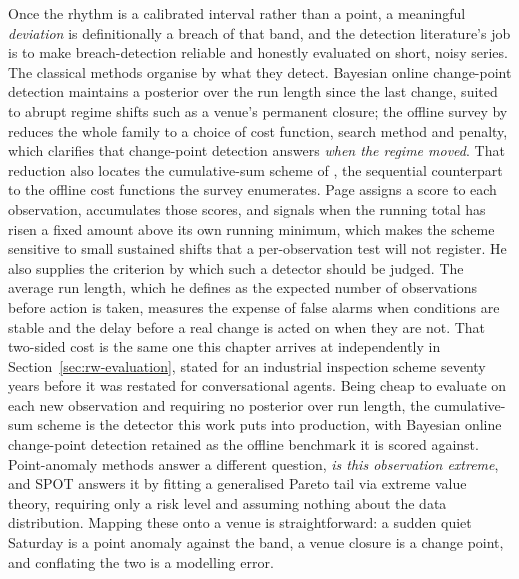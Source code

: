 Once the rhythm is a calibrated interval rather than a point, a meaningful
\emph{deviation} is definitionally a breach of that band, and the detection
literature's job is to make breach-detection reliable and honestly evaluated
on short, noisy series. The classical methods organise by what they detect.
Bayesian online change-point detection \citep{adams_bayesian_2007} maintains a
posterior over the run length since the last change, suited to abrupt regime
shifts such as a venue's permanent closure; the offline survey by
\citet{truong_selective_2020} reduces the whole family to a choice of cost
function, search method and penalty, which clarifies that change-point
detection answers \emph{when the regime moved}. That reduction also locates
the cumulative-sum scheme of \citet{page_continuous_1954}, the sequential
counterpart to the offline cost functions the survey enumerates. Page assigns
a score to each observation, accumulates those scores, and signals when the
running total has risen a fixed amount above its own running minimum, which
makes the scheme sensitive to small sustained shifts that a per-observation
test will not register. He also supplies the criterion by which such a
detector should be judged. The average run length, which he defines as the
expected number of observations before action is taken, measures the expense
of false alarms when conditions are stable and the delay before a real change
is acted on when they are not. That two-sided cost is the same one this
chapter arrives at independently in Section~\ref{sec:rw-evaluation}, stated
for an industrial inspection scheme seventy years before it was restated for
conversational agents. Being cheap to evaluate on each new observation and
requiring no posterior over run length, the cumulative-sum scheme is the
detector this work puts into production, with Bayesian online change-point
detection retained as the offline benchmark it is scored against.
Point-anomaly methods answer a different question, \emph{is this observation
extreme}, and SPOT \citep{siffer_anomaly_2017} answers it by fitting a
generalised Pareto tail via extreme value theory, requiring only a risk level
and assuming nothing about the data distribution. Mapping these onto a venue is
straightforward: a sudden quiet Saturday is a point anomaly against the band, a
venue closure is a change point, and conflating the two is a modelling error.

